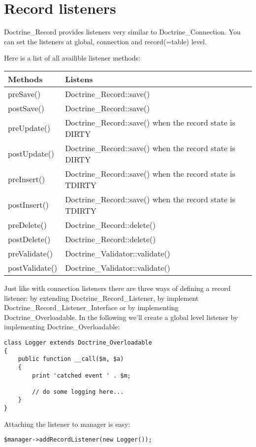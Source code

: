 \documentclass[11pt,a4paper]{report}
\begin{document}
\section{Record listeners}
Doctrine\_Record provides listeners very similar to Doctrine\_Connection. You can set the listeners at global, connection and record(=table) level.

Here is a list of all availible listener methods:

\begin{tabular}{|l|l|}
\hline
Methods & Listens\\
\hline
preSave() & Doctrine\_Record::save()\\
\hline
postSave() & Doctrine\_Record::save()\\
\hline
preUpdate() & Doctrine\_Record::save() when the record state is DIRTY\\
\hline
postUpdate() & Doctrine\_Record::save() when the record state is DIRTY\\
\hline
preInsert() & Doctrine\_Record::save() when the record state is TDIRTY\\
\hline
postInsert() & Doctrine\_Record::save() when the record state is TDIRTY\\
\hline
preDelete() & Doctrine\_Record::delete()\\
\hline
postDelete() & Doctrine\_Record::delete()\\
\hline
preValidate() & Doctrine\_Validator::validate()\\
\hline
postValidate() & Doctrine\_Validator::validate()\\
\hline
\end{tabular}
Just like with connection listeners there are three ways of defining a record listener: by extending Doctrine\_Record\_Listener, by implement Doctrine\_Record\_Listener\_Interface or by implementing Doctrine\_Overloadable. In the following we'll create a global level listener by implementing Doctrine\_Overloadable:

\begin{verbatim}
class Logger extends Doctrine_Overloadable
{
    public function __call($m, $a)
    {
        print 'catched event ' . $m;

        // do some logging here...
    }
}
\end{verbatim}

Attaching the listener to manager is easy:

\begin{verbatim}
$manager->addRecordListener(new Logger());
\end{verbatim}
\end{document}
